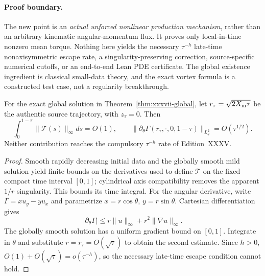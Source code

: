 \paragraph{Proof boundary.}
The new point is an \emph{actual unforced nonlinear
production mechanism}, rather than an arbitrary
kinematic angular-momentum flux.
It proves only local-in-time nonzero mean torque.
Nothing here yields the necessary
$\tau^{-h}$ late-time nonaxisymmetric escape rate,
a singularity-preserving correction,
source-specific numerical cutoffs,
or an end-to-end Lean PDE certificate.
The global existence ingredient is classical
small-data theory, and the exact vortex formula
is a constructed test case, not a regularity breakthrough.


\begin{proposition}
\label{prop:xxxvii-no-late-escape}
For the exact global solution in
Theorem~\ref{thm:xxxvii-global}, let $r_\tau=
\sqrt{2X_{\rm in}\tau}$ be the authentic source
trajectory, with $z_\tau=0$. Then
\begin{equation}\label{eq:xxxvii-no-late-escape}
\boxed{\quad
\int_0^{1-\tau}\|\mathcal T(s)\|_\infty ds=O(1),
\qquad
\|\partial_\theta\Gamma(r_\tau,\cdot,0,1-\tau)
\|_{L^2_\theta}=O(\tau^{1/2}).\quad}
\end{equation}
Neither contribution reaches the compulsory
$\tau^{-h}$ rate of Edition~XXXV.
\end{proposition}
\begin{proof}
Smooth rapidly decreasing initial data and the
globally smooth mild solution yield finite bounds on
the derivatives used to define $\mathcal T$ on the
fixed compact time interval $[0,1]$; cylindrical
axis compatibility removes the apparent $1/r$
singularity. This bounds its time integral.
For the angular derivative, write
$\Gamma=xu_y-yu_x$ and parametrize
$x=r\cos\theta$, $y=r\sin\theta$.
Cartesian differentiation gives
\[
|\partial_\theta\Gamma|
\le r\|u\|_\infty+r^2\|\nabla u\|_\infty.
\]
The globally smooth solution has a uniform gradient
bound on $[0,1]$. Integrate in $\theta$ and substitute
$r=r_\tau=O(\sqrt\tau)$ to obtain the
second estimate. Since $h>0$, $O(1)+
O(\sqrt\tau)=o(\tau^{-h})$, so the necessary
late-time escape condition cannot hold.
\end{proof}
